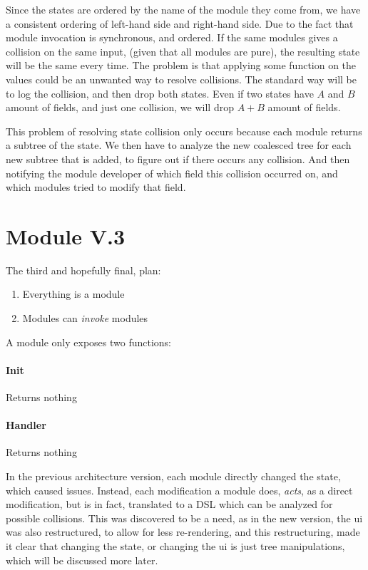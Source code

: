 Since the states are ordered by the name of the module they come from, we
have a consistent ordering of left-hand side and right-hand side. Due to the
fact that module invocation is synchronous, and ordered. If the same modules
gives a collision on the same input, (given that all modules are pure), the
resulting state will be the same every time. The problem is that applying some
function on the values could be an unwanted way to resolve collisions. The
standard way will be to log the collision, and then drop both states. Even
if two states have $A$ and $B$ amount of fields, and just one collision, we will
drop $A + B$ amount of fields.

This problem of resolving state collision only occurs because each module
returns a subtree of the state. We then have to analyze the new coalesced tree
for each new subtree that is added, to figure out if there occurs any collision.
And then notifying the module developer of which field this collision occurred
on, and which modules tried to modify that field.

\section{Module V.3} \label{sec:moD3}

The third and hopefully final, plan:

\begin{enumerate}
  \item Everything is a module
  \item Modules can \textit{invoke} modules
\end{enumerate}

A module only exposes two functions:

\paragraph{Init} Returns nothing

\paragraph{Handler} Returns nothing

In the previous architecture version, each module directly changed the state,
which caused issues. Instead, each modification a module does, \textit{acts}, as
a direct modification, but is in fact, translated to a DSL which can be analyzed
for possible collisions. This was discovered to be a need, as in the new
version, the \gls{ui} was also restructured, to allow for less re-rendering, and
this restructuring, made it clear that changing the state, or changing the
\gls{ui} is just tree manipulations, which will be discussed more later.

